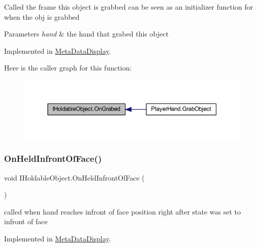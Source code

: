 Called the frame this object is grabbed can be seen as an initializer function for when the obj is grabbed 


\begin{DoxyParams}{Parameters}
{\em hand} & the hand that grabed this object\\
\hline
\end{DoxyParams}


Implemented in \mbox{\hyperlink{class_meta_data_display_a7d639d7bc58c9340a7f5274884bbc11d}{Meta\+Data\+Display}}.

Here is the caller graph for this function\+:\nopagebreak
\begin{figure}[H]
\begin{center}
\leavevmode
\includegraphics[width=350pt]{interface_i_holdable_object_a7b8a42a0c12a26b1668c4dd904f38355_icgraph}
\end{center}
\end{figure}
\mbox{\label{interface_i_holdable_object_a6f63fec8fb8f715ad5cdd08aa5ec0ea5}} 
\subsubsection{\texorpdfstring{On\+Held\+Infront\+Of\+Face()}{OnHeldInfrontOfFace()}}
{\footnotesize\ttfamily void I\+Holdable\+Object.\+On\+Held\+Infront\+Of\+Face (\begin{DoxyParamCaption}{ }\end{DoxyParamCaption})}



called when hand reaches infront of face position right after state was set to infront of face 



Implemented in \mbox{\hyperlink{class_meta_data_display_ab91c62e23ca6af27f8a30859d5a172c9}{Meta\+Data\+Display}}.

